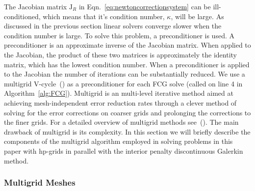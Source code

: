 The Jacobian matrix $\mathrm{J}_R$ in Eqn.~\ref{eq:newtoncorrectionsystem} can be ill-conditioned, which means that it's condition number, $\kappa$, will be large. As discussed in the previous section linear solvers converge slower when the condition number is large. To solve this problem, a preconditioner is used. A preconditioner is an approximate inverse of the Jacobian matrix. When applied to the Jacobian, the product of these two matrices is approximately the identity matrix, which has the lowest condition number. When a preconditioner is applied to the Jacobian the number of iterations can be substantially reduced.
We use a multigrid V-cycle~(\citet*{briggs2000multigrid}) as a preconditioner for each
FCG solve (called on line 4 in Algorithm~\ref{alg:FCG}). 
Multigrid is an multi-level iterative method aimed at achieving
mesh-independent error reduction rates through a clever method of
solving for the error corrections on coarser grids and prolonging the
corrections to the finer grids. For a detailed overview of multigrid
methods see~(\citet*{briggs2000multigrid}). The main drawback of multigrid
is its complexity. In this section we will briefly describe the
components of the multigrid algorithm employed in solving problems in
this paper with hp-grids in parallel with the interior penalty
discontinuous Galerkin method.

\subsubsection{Multigrid Meshes}
\label{sec:MultigridMeshes}

